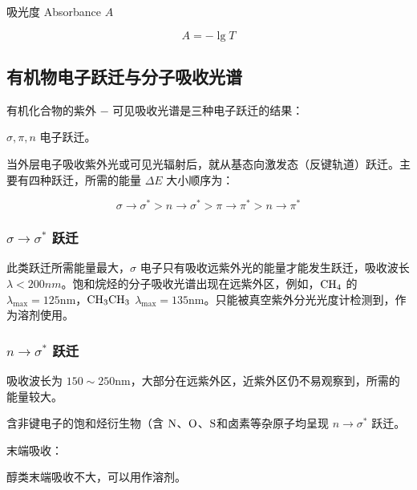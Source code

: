 吸光度 Absorbance $A$

\begin{equation}
    A = - \lg T
\end{equation}

\subsection{有机物电子跃迁与分子吸收光谱}

有机化合物的紫外 $-$ 可见吸收光谱是三种电子跃迁的结果：

$\sigma, \pi, n$ 电子跃迁。

当外层电子吸收紫外光或可见光辐射后，就从基态向激发态（反键轨道）跃迁。主要有四种跃迁，所需的能量 $\Delta E$ 大小顺序为：

\begin{equation}
    \sigma \rightarrow \sigma^* > n \rightarrow \sigma^* > \pi \rightarrow \pi^* > n \rightarrow \pi^*
\end{equation}

\subsubsection{$\sigma \rightarrow \sigma^*$ 跃迁}

此类跃迁所需能量最大，$\sigma$ 电子只有吸收远紫外光的能量才能发生跃迁，吸收波长 $\lambda < 200 nm$。饱和烷烃的分子吸收光谱出现在远紫外区，例如，$\ce{CH4}$ 的 $\lambda_{\max} = 125 \mathrm{nm}$，$\ce{CH3CH3}$ $\lambda_{\max} = 135 \mathrm{nm}$。只能被真空紫外分光光度计检测到，作为溶剂使用。

\subsubsection{$n \rightarrow \sigma^*$ 跃迁}

吸收波长为 $ 150 \sim 250 \mathrm{nm} $，大部分在远紫外区，近紫外区仍不易观察到，所需的能量较大。

含非键电子的饱和烃衍生物（含 $\ce{N}$、$\ce{O}$、$\ce{S}$和卤素等杂原子均呈现 $n \rightarrow \sigma^*$ 跃迁。

末端吸收：

醇类末端吸收不大，可以用作溶剂。

